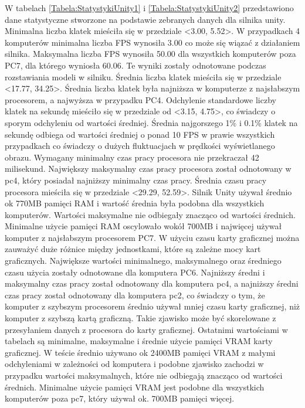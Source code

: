 \documentclass[12pt,twoside]{article}
\begin{document}
W tabelach \ref{Tabela:StatystykiUnity1} i \ref{Tabela:StatystykiUnity2}
przedstawiono dane statystyczne stworzone na podstawie zebranych danych dla
silnika unity. Minimalna liczba klatek mieściła się w przedziale <3.00, 5.52>. W
przypadkach 4 komputerów minimalna liczba FPS wynosiła 3.00 co może się wiązać z
działaniem silnika. Maksymalna liczba FPS wynosiła 50.00 dla wszystkich
komputerów poza PC7, dla którego wyniosła 60.06. Te wyniki zostały odnotowane
podczas rozstawiania modeli w silniku. Średnia liczba klatek mieściła się w
przedziale <17.77, 34.25>. Średnia liczba klatek była najniższa w komputerze z
najsłabszym procesorem, a najwyższa w przypadku PC4. Odchylenie standardowe
liczby klatek na sekundę mieściło się w przedziale od <3.15, 4.75>, co świadczy
o sporym odchyleniu od wartości średniej. Średnia najgorszego 1\% i 0.1\% klatek
na sekundę odbiega od wartości średniej o ponad 10 FPS w prawie wszystkich
przypadkach co świadczy o dużych fluktuacjach w prędkości wyświetlanego obrazu.
Wymagany minimalny czas pracy procesora nie przekraczał 42 milisekund.
Największy maksymalny czas pracy procesora został odnotowany w pc4, który
posiadał najniższy minimalny czas pracy.  Średnia czasu pracy procesora mieściła
się w przedziale <29.29, 52.59>. Silnik Unity używał średnio ok 770MB pamięci
RAM i wartość średnia była podobna dla wszystkich komputerów. Wartości
maksymalne nie odbiegały znacząco od wartości średnich. Minimalne użycie pamięci
RAM oscylowało wokół 700MB i najwięcej używał komputer z najsłabszym procesorem
PC7. W użyciu czasu karty graficznej można zauważyć duże różnice między
jednostkami, które są zależne mocy kart graficznych. Największe wartości
minimalnego, maksymalnego oraz średniego czasu użycia zostały odnotowane dla
komputera PC6. Najniższy średni i maksymalny czas pracy został odnotowany dla
komputera pc4, a najniższy średni czas pracy został odnotowany dla komputera
pc2, co świadczy o tym, że komputer z szybszym procesorem średnio używał mniej
czasu karty graficznej, niż komputer z szybszą kartą graficzną. Takie zjawisko
może być skorelowane z przesyłaniem danych z procesora do karty graficznej.
Ostatnimi wartościami w tabelach są minimalne, maksymalne i średnie użycie
pamięci VRAM karty graficznej. W teście średnio używano ok 2400MB pamięci VRAM z
małymi odchyleniami w zależności od komputera i podobne zjawisko zachodzi w
przypadku wartości maksymalnych, które nie odbiegają znacząco od wartości
średnich. Minimalne użycie pamięci VRAM jest podobne dla wszystkich komputerów
poza pc7, który używał ok. 700MB pamięci więcej. 
\end{document}
